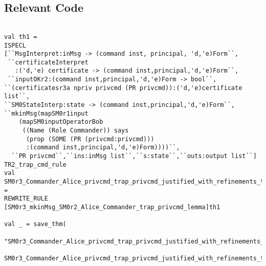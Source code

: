 \documentclass{report}
\begin{document}
\subsection{Relevant Code}
\label{rel-code-6}
\begin{lstlisting}[frame=TBlr]

val th1 =
ISPECL
[``MsgInterpret:inMsg -> (command inst, principal, 'd,'e)Form``,
 ``certificateInterpret
   :('d,'e) certificate -> (command inst,principal,'d,'e)Form``,
 ``inputOKr2:(command inst,principal,'d,'e)Form -> bool``,
``(certificatesr3a npriv privcmd (PR privcmd)):('d,'e)certificate list``,
``SM0StateInterp:state -> (command inst,principal,'d,'e)Form``,
``mkinMsg(mapSM0r1input
    (mapSM0inputOperatorBob
     ((Name (Role Commander)) says
      (prop (SOME (PR (privcmd:privcmd)))
      :(command inst,principal,'d,'e)Form))))``,
  ``PR privcmd``,``ins:inMsg list``,``s:state``,``outs:output list``]
TR2_trap_cmd_rule
val SM0r3_Commander_Alice_privcmd_trap_privcmd_justified_with_refinements_thm =
REWRITE_RULE
[SM0r3_mkinMsg_SM0r2_Alice_Commander_trap_privcmd_lemma]th1

val _ = save_thm(
   "SM0r3_Commander_Alice_privcmd_trap_privcmd_justified_with_refinements_thm",
   SM0r3_Commander_Alice_privcmd_trap_privcmd_justified_with_refinements_thm)


\end{lstlisting}
\end{document}
